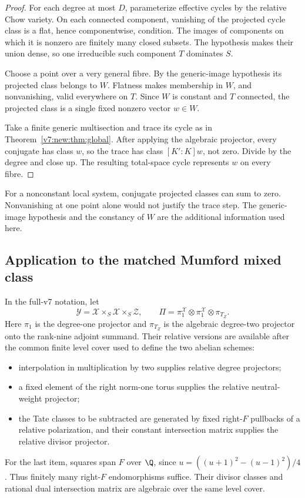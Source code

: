 \begin{proof}
For each degree at most \(D\), parameterize effective cycles by the
relative Chow variety. On each connected component, vanishing of
the projected cycle class is a flat, hence componentwise, condition.
The images of components on which it is nonzero are finitely many
closed subsets. The hypothesis makes their union dense, so one
irreducible such component \(T\) dominates \(S\).

Choose a point over a very general fibre. By the generic-image hypothesis its projected class
belongs to \(W\). Flatness makes membership in \(W\), and nonvanishing,
valid everywhere on \(T\). Since \(W\) is constant and \(T\) connected,
the projected class is a single fixed nonzero vector \(w\in W\).

Take a finite generic multisection and trace its cycle as in
Theorem~\ref{v7:new:thm:global}. After applying the algebraic projector,
every conjugate has class \(w\), so the trace has class
\([K':K]w\), not zero. Divide by the degree and close up.
The resulting total-space cycle represents \(w\) on every fibre.
\end{proof}

\begin{remark}
For a nonconstant local system, conjugate projected classes can sum
to zero. Nonvanishing at one point alone would not justify the trace
step. The generic-image hypothesis and the constancy of \(W\) are the additional
information used here.
\end{remark}

\subsection*{Application to the matched Mumford mixed class}

In the full-v7 notation, let
\[
 \mathcal Y=\mathcal X\times_S\mathcal X\times_S\mathcal Z,\qquad
 \Pi=\pi_1^{\mathcal X}\otimes\pi_1^{\mathcal X}
                         \otimes\pi_{T_Z}.
\]
Here \(\pi_1\) is the degree-one projector and \(\pi_{T_Z}\) is the
algebraic degree-two projector onto the rank-nine adjoint summand.
Their relative versions are available after the common finite level
cover used to define the two abelian schemes:
\begin{itemize}
\item interpolation in multiplication by two supplies relative
degree projectors;
\item a fixed element of the right norm-one torus supplies the
relative neutral-weight projector;
\item the Tate classes to be subtracted are generated by fixed
right-\(F\) pullbacks of a relative polarization, and their constant
intersection matrix supplies the relative divisor projector.
\end{itemize}
For the last item, squares span \(F\) over \(\Q\), since
\(u=((u+1)^2-(u-1)^2)/4\). Thus finitely many right-\(F\)
endomorphisms suffice. Their divisor classes and rational dual
intersection matrix are algebraic over the same level cover.

